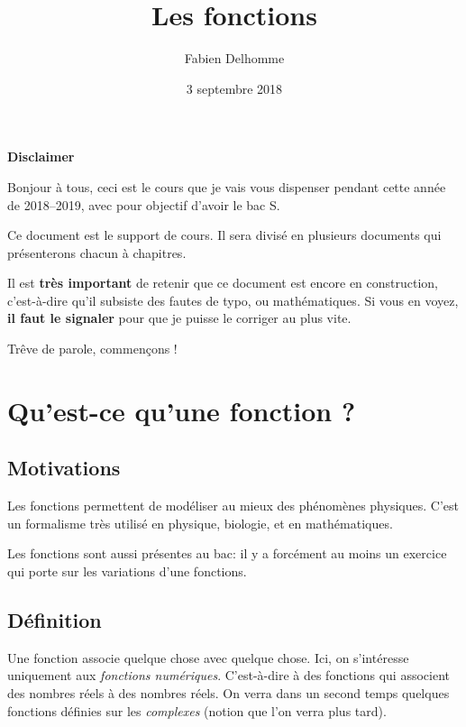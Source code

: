 \documentclass[french,]{article}
\title{Les fonctions}
\author{Fabien Delhomme}
\date{3 septembre 2018}
\begin{document}
\maketitle

\newpage

\textbf{\huge{Disclaimer}}

Bonjour à tous, ceci est le cours que je vais vous dispenser pendant
cette année de 2018--2019, avec pour objectif d'avoir le bac S.

Ce document est le support de cours. Il sera divisé en plusieurs
documents qui présenterons chacun à chapitres.

Il est \textbf{très important} de retenir que ce document est encore en
construction, c'est-à-dire qu'il subsiste des fautes de typo, ou
mathématiques. Si vous en voyez, \textbf{il faut le signaler} pour que
je puisse le corriger au plus vite.

Trêve de parole, commençons !

\newpage

\hypertarget{quest-ce-quune-fonction}{%
\section{Qu'est-ce qu'une fonction ?}\label{quest-ce-quune-fonction}}

\hypertarget{motivations}{%
\subsection{Motivations}\label{motivations}}

Les fonctions permettent de modéliser au mieux des phénomènes physiques.
C'est un formalisme très utilisé en physique, biologie, et en
mathématiques.

Les fonctions sont aussi présentes au bac: il y a forcément au moins un
exercice qui porte sur les variations d'une fonctions.

\hypertarget{duxe9finition}{%
\subsection{Définition}\label{duxe9finition}}

Une fonction associe quelque chose avec quelque chose. Ici, on
s'intéresse uniquement aux \emph{fonctions numériques}. C'est-à-dire à
des fonctions qui associent des nombres réels à des nombres réels. On
verra dans un second temps quelques fonctions définies sur les
\emph{complexes} (notion que l'on verra plus tard).
\end{document}

